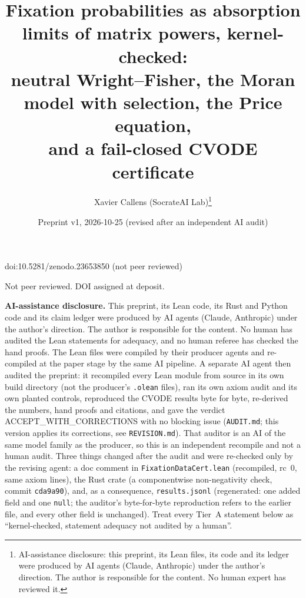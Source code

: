 \documentclass[11pt]{article}
\title{Fixation probabilities as absorption limits of matrix powers, kernel-checked:\\
neutral Wright--Fisher, the Moran model with selection, the Price equation,\\
and a fail-closed CVODE certificate}
\author{Xavier Callens (SocrateAI Lab)\thanks{AI-assistance disclosure: this preprint, its Lean files, its code and
its ledger were produced by AI agents (Claude, Anthropic) under the author's direction. The author is responsible for
the content. No human expert has reviewed it.}}
\date{Preprint v1, 2026-10-25 (revised after an independent AI audit)}
\theoremstyle{remark}
\newcommand{\lean}[1]{\texttt{#1}}
\begin{document}
\maketitle
\begin{center}\small doi:10.5281/zenodo.23653850 \quad (not peer reviewed)\end{center}

\begin{center}\small Not peer reviewed. DOI assigned at deposit.\end{center}

\noindent\textbf{AI-assistance disclosure.} This preprint, its Lean code, its Rust and Python code and its claim ledger
were produced by AI agents (Claude, Anthropic) under the author's direction. The author is responsible for the content.
No human has audited the Lean statements for adequacy, and no human referee has checked the hand proofs. The Lean files
were compiled by their producer agents and re-compiled at the paper stage by the same AI pipeline. A separate AI agent
then audited the preprint: it recompiled every Lean module from source in its own build directory (not the producer's
\texttt{.olean} files), ran its own axiom audit and its own planted controls, reproduced the CVODE results byte for byte,
re-derived the numbers, hand proofs and citations, and gave the verdict ACCEPT\_WITH\_CORRECTIONS with no blocking issue
(\texttt{AUDIT.md}; this version applies its corrections, see \texttt{REVISION.md}). That auditor is an AI of the same model
family as the producer, so this is an independent recompile and not a human audit. Three things changed after the audit
and were re-checked only by the revising agent: a doc comment in \lean{FixationDataCert.lean} (recompiled, rc~0, same axiom
lines), the Rust crate (a componentwise non-negativity check, commit \texttt{cda9a90}), and, as a consequence, \texttt{results.jsonl}
(regenerated: one added field and one \texttt{null}; the auditor's byte-for-byte reproduction refers to the earlier file, and every other field is unchanged). Treat every Tier~A statement
below as ``kernel-checked, statement adequacy not audited by a human''.
\end{document}
